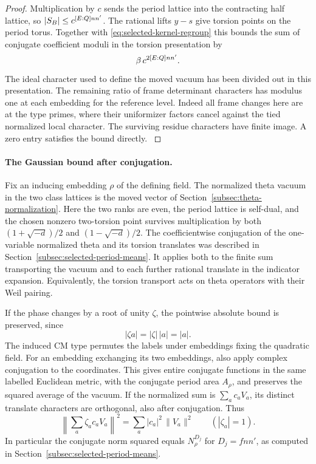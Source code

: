 \begin{proof}
Multiplication
by \(c\) sends the period lattice into the contracting
half lattice, so \(|S_B|\le c^{[E:Q]nn'}\). The rational
lifts \(y-s\) give torsion points on the period torus.
Together with \eqref{eq:selected-kernel-regroup} this
bounds the sum of conjugate coefficient moduli in the
torsion presentation by
\begin{equation}\label{eq:selected-kernel-coeff-l1}
             \beta\,c^{2[E:Q]nn'} .
\end{equation}
The ideal character used to define the moved vacuum
has been divided out in this presentation. The
remaining ratio of frame determinant characters has
modulus one at each embedding for the reference level.
Indeed all frame changes here are at the type primes,
where their uniformizer factors cancel against the tied
normalized local character. The surviving residue
characters have finite image. A zero entry satisfies the
bound directly.
\label{cor:selected-kernel-jets-3}
\end{proof}

\paragraph{The Gaussian bound after conjugation.}
Fix an inducing embedding \(\rho\) of the defining field.
The normalized theta vacuum in the two class lattices
is the moved vector of Section~\ref{subsec:theta-normalization}.
Here the two ranks are even, the period lattice is self-dual,
and the chosen nonzero two-torsion point survives multiplication by both
\((1+\sqrt{-d})/2\) and \((1-\sqrt{-d})/2\). The
coefficientwise conjugation of the one-variable normalized
theta and its torsion translates was described in
Section~\ref{subsec:selected-period-means}. It applies both
to the finite sum transporting the vacuum and to each
further rational translate in the indicator expansion.
Equivalently, the torsion transport acts on theta operators
with their Weil pairing.

If the phase changes by a root of unity \(\zeta\), the pointwise absolute bound is preserved, since
\[
 |\zeta a|=|\zeta|\,|a|=|a|.
\]
The induced CM type permutes the labels under embeddings
fixing the quadratic field. For an embedding exchanging
its two embeddings, also apply complex conjugation to the
coordinates. This gives entire conjugate functions in the
same labelled Euclidean metric, with the conjugate period
area \(A_\rho\), and preserves the squared average of the
vacuum. If the normalized sum is \(\sum_a c_aV_a\), its distinct
translate characters are orthogonal, also after conjugation. Thus
\[
 \left\|\sum_a\zeta_a c_aV_a\right\|^2
   =\sum_a |c_a|^2\,\|V_a\|^2\qquad(|\zeta_a|=1).
\] In particular the conjugate norm
squared equals \(N_\rho^{D_j}\) for
\(D_j=f nn'\), as computed in
Section~\ref{subsec:selected-period-means}.
\label{cor:selected-kernel-jets-4}

